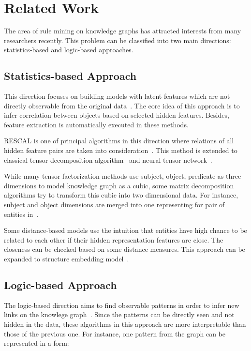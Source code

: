 \chapter{Related Work}

The area of rule mining on knowledge graphs has attracted interests from many researchers recently. This problem can be classified into two main directions: statistics-based and logic-based approaches.

\section{Statistics-based Approach}

This direction focuses on building models with latent features which are not directly observable from the original data~\cite{ref1}. The core idea of this approach is to infer correlation between objects based on selected hidden features. Besides, feature extraction is automatically executed in these methods.

RESCAL is one of principal algorithms in this direction where relations of all hidden feature pairs are taken into consideration~\cite{ref2, ref3}. This method is extended to classical tensor decomposition algorithm~\cite{ref4} and neural tensor network~\cite{ref5}.

While many tensor factorization methods use subject, object, predicate as three dimensions to model knowledge graph as a cubic, some matrix decomposition algorithms try to transform this cubic into two dimensional data. For instance, subject and object dimensions are merged into one representing for pair of entities in~\cite{ref6, ref7}.

Some distance-based models use the intuition that entities have high chance to be related to each other if their hidden representation features are close. The closeness can be checked based on some distance measures. This approach can be expanded to structure embedding model~\cite{ref8}.

\section{Logic-based Approach}

The logic-based direction aims to find observable patterns in order to infer new links on the knowlege graph~\cite{ref1}. Since the patterns can be directly seen and not hidden in the data, these algorithms in this approach are more interpretable than those of the previous one. For instance, one pattern from the graph can be represented in a form:\\

